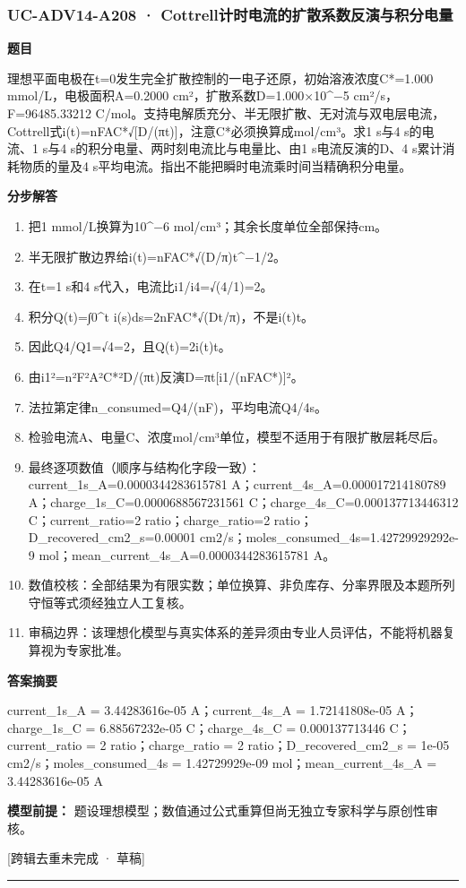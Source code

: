 \documentclass[UTF8,11pt,a4paper]{ctexart}
\begin{document}
\subsubsection*{UC-ADV14-A208 · Cottrell计时电流的扩散系数反演与积分电量}
\noindent\textbf{题目}\par
理想平面电极在t=0发生完全扩散控制的一电子还原，初始溶液浓度C*=1.000 mmol/L，电极面积A=0.2000 cm²，扩散系数D=1.000×10\textasciicircum{}−5 cm²/s，F=96485.33212 C/mol。支持电解质充分、半无限扩散、无对流与双电层电流，Cottrell式i(t)=nFAC*√[D/(πt)]，注意C*必须换算成mol/cm³。求1 s与4 s的电流、1 s与4 s的积分电量、两时刻电流比与电量比、由1 s电流反演的D、4 s累计消耗物质的量及4 s平均电流。指出不能把瞬时电流乘时间当精确积分电量。\par
\medskip\noindent\textbf{分步解答}
\begin{enumerate}
\item 把1 mmol/L换算为10\textasciicircum{}−6 mol/cm³；其余长度单位全部保持cm。
\item 半无限扩散边界给i(t)=nFAC*√(D/π)t\textasciicircum{}−1/2。
\item 在t=1 s和4 s代入，电流比i1/i4=√(4/1)=2。
\item 积分Q(t)=∫0\textasciicircum{}t i(s)ds=2nFAC*√(Dt/π)，不是i(t)t。
\item 因此Q4/Q1=√4=2，且Q(t)=2i(t)t。
\item 由i1²=n²F²A²C*²D/(πt)反演D=πt[i1/(nFAC*)]²。
\item 法拉第定律n\_consumed=Q4/(nF)，平均电流Q4/4s。
\item 检验电流A、电量C、浓度mol/cm³单位，模型不适用于有限扩散层耗尽后。
\item 最终逐项数值（顺序与结构化字段一致）：current\_1s\_A=0.0000344283615781 A；current\_4s\_A=0.000017214180789 A；charge\_1s\_C=0.0000688567231561 C；charge\_4s\_C=0.000137713446312 C；current\_ratio=2 ratio；charge\_ratio=2 ratio；D\_recovered\_cm2\_s=0.00001 cm2/s；moles\_consumed\_4s=1.42729929292e-9 mol；mean\_current\_4s\_A=0.0000344283615781 A。
\item 数值校核：全部结果为有限实数；单位换算、非负库存、分率界限及本题所列守恒等式须经独立人工复核。
\item 审稿边界：该理想化模型与真实体系的差异须由专业人员评估，不能将机器复算视为专家批准。
\end{enumerate}
\noindent\textbf{答案摘要}\par
current\_1s\_A = 3.44283616e-05 A；current\_4s\_A = 1.72141808e-05 A；charge\_1s\_C = 6.88567232e-05 C；charge\_4s\_C = 0.000137713446 C；current\_ratio = 2 ratio；charge\_ratio = 2 ratio；D\_recovered\_cm2\_s = 1e-05 cm2/s；moles\_consumed\_4s = 1.42729929e-09 mol；mean\_current\_4s\_A = 3.44283616e-05 A\par
\noindent\textbf{模型前提：}
题设理想模型；数值通过公式重算但尚无独立专家科学与原创性审核。\par
\noindent\textcolor{red!65!black}{[跨辑去重未完成 · 草稿]} \par
\medskip\hrule\medskip
{}
\end{document}
